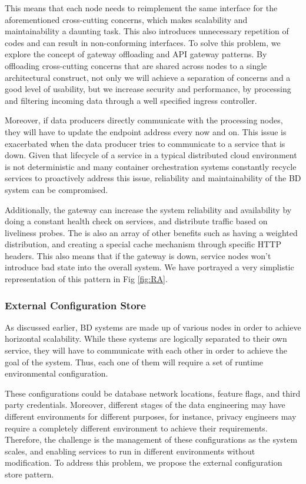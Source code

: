 \documentclass[a4paper,11pt,article,oneside]{memoir}
\begin{document}
This means that each node needs to reimplement the same interface for the aforementioned cross-cutting concerns, which makes scalability and maintainability a daunting task. This also introduces unnecessary repetition of codes and can result in non-conforming interfaces. To solve this problem, we explore the concept of gateway offloading and API gateway patterns. By offloading cross-cutting concerns that are shared across nodes to a single architectural construct, not only we will achieve a separation of concerns and a good level of usability, but we increase security and performance, by processing and filtering incoming data through a well specified ingress controller.

Moreover, if data producers directly communicate with the processing nodes, they will have to update the endpoint address every now and on. This issue is exacerbated when the data producer tries to communicate to a service that is down. Given that lifecycle of a service in a typical distributed cloud environment is not deterministic and many container orchestration systems constantly recycle services to proactively address this issue, reliability and maintainability of the BD system can be compromised.

Additionally, the gateway can increase the system reliability and availability by doing a constant health check on services, and distribute traffic based on liveliness probes. The is also an array of other benefits such as having a weighted distribution, and creating a special cache mechanism through specific HTTP headers. This also means that if the gateway is down, service nodes won't introduce bad state into the overall system. We have portrayed a very simplistic representation of this pattern in Fig \ref{fig:RA}. 

\subsubsection{External Configuration Store}

As discussed earlier, BD systems are made up of various nodes in order to achieve horizontal scalability. While these systems are logically separated to their own service, they will have to communicate with each other in order to achieve the goal of the system. Thus, each one of them will require a set of runtime environmental configuration. 

These configurations could be database network locations, feature flags, and third party credentials. Moreover, different stages of the data engineering may have different environments for different purposes, for instance, privacy engineers may require a completely different environment to achieve their requirements. Therefore, the challenge is the management of these configurations as the system scales, and enabling services to run in different environments without modification. To address this problem, we propose the external configuration store pattern.
\end{document}

